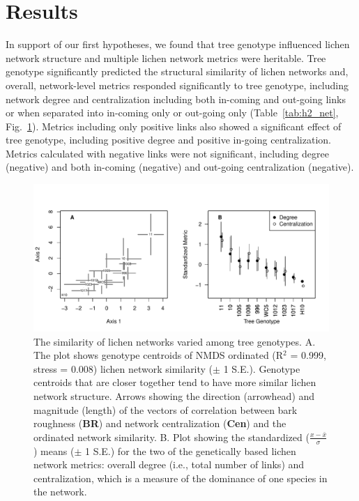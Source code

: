 \documentclass[fleqn,12pt]{olplainarticle}
\begin{document}
\section*{Results}

In support of our first hypotheses, we found that tree genotype
influenced lichen network structure and multiple lichen network
metrics were heritable.  Tree genotype significantly predicted the
structural similarity of lichen networks and, overall, network-level
metrics responded significantly to tree genotype, including network
degree and centralization including both in-coming and out-going links
or when separated into in-coming only or out-going only
(Table~\ref{tab:h2_net}, Fig.~\ref{fig:h2_plot}).  Metrics including
only positive links also showed a significant effect of tree genotype,
including positive degree and positive in-going centralization.
Metrics calculated with negative links were not significant, including
degree (negative) and both in-coming (negative) and out-going
centralization (negative).

\begin{figure}[ht]
\centering
\includegraphics[width=\linewidth]{figures/h2_plot.pdf}
\caption{The similarity of lichen networks varied among tree
  genotypes. A. The plot shows genotype centroids of NMDS ordinated
  (R$^2$ = 0.999, stress = 0.008) lichen network similarity ($\pm$ 1
  S.E.). Genotype centroids that are closer together tend to have more
  similar lichen network structure. Arrows showing the direction
  (arrowhead) and magnitude (length) of the vectors of correlation
  between bark roughness (\textbf{BR}) and network centralization
  (\textbf{Cen}) and the ordinated network similarity. B. Plot showing
  the standardized ($\frac{x - \bar{x}}{\sigma}$) means ($\pm$ 1 S.E.)
  for the two of the genetically based lichen network metrics: overall
  degree (i.e., total number of links) and centralization, which is a
  measure of the dominance of one species in the network.}
\label{fig:h2_plot}
\end{figure}
\end{document}
